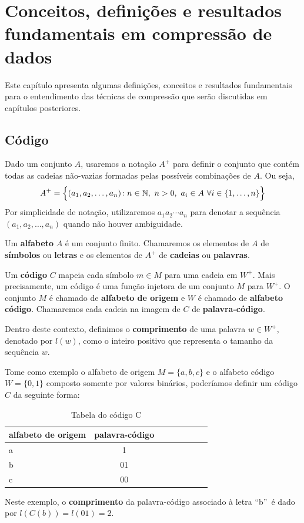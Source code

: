 \chapter{Conceitos, definições e resultados fundamentais em compressão de dados}
Este capítulo apresenta algumas definições, conceitos e resultados fundamentais para o entendimento das técnicas de compressão que serão discutidas em capítulos posteriores.

\section{Código}

Dado um conjunto $A$, usaremos a notação $A^+$ para definir o conjunto
que contém todas as cadeias não-vazias formadas pelas possíveis
combinações de $A$. Ou seja,
\begin{equation*}
  \emph{A}^+ = \Big\{
  (a_1,a_2,\dotsc, a_n) \colon n\in\mathbb{N}, \ n>0,
  \ a_i \in A \ \forall i \in \{1,\dotsc,n\} 
  \Big\}
\end{equation*}
Por simplicidade de notação, utilizaremos $a_1a_2\dotsm a_n$ para
denotar a sequência $(a_1,a_2,\dotsc, a_n)$ quando não houver
ambiguidade.

Um \textbf{alfabeto} $A$ é um conjunto finito. Chamaremos os elementos
de $A$ de \textbf{símbolos} ou \textbf{letras} e os elementos de $A^+$
de \textbf{cadeias} ou \textbf{palavras}.

Um \textbf{código} $C$ mapeia cada símbolo $m \in M$ para uma cadeia
em $W^+$. Mais precisamente, um código é uma função injetora de um
conjunto $M$ para $W^+$. O conjunto $M$ é chamado de \textbf{alfabeto
  de origem} e $W$ é chamado de \textbf{alfabeto código}. Chamaremos
cada cadeia na imagem de $C$ de \textbf{palavra-código}.

Dentro deste contexto, definimos o \textbf{comprimento} de uma palavra
$w\in W^+$, denotado por $l(w)$, como o inteiro positivo que
representa o tamanho da sequência $w$.

Tome como exemplo o alfabeto de origem $M = \{a, b, c\}$ e o alfabeto
código $W = \{0, 1\}$ composto somente por valores binários,
poderíamos definir um código $C$ da seguinte forma:

\begin{table}[!h]
   \centering
   \caption{Tabela do código C} \label{tab:vcode}
   \begin{tabular}{|l|c|c|c|c|c|c|r|}
        \hline
        \small{alfabeto de origem} & \small{palavra-código} \\ \hline
              a &   1   \\ \hline
              b &   01  \\ \hline
              c &   00  \\ \hline
  \end{tabular}
\end{table}
Neste exemplo, o \textbf{comprimento} da palavra-código associado à
letra ``b''~é dado por $l(C(b)) = l(01) = 2$.

